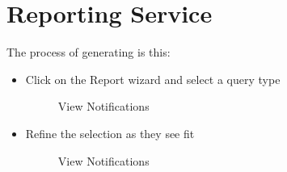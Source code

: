 \documentclass[12pt]{article}
\begin{document}
\section{Reporting Service}
The process of generating is this:
\begin{itemize}
\item Click on the Report wizard and select a query type
\begin{figure}[H]
\centering	
{}
\caption{View Notifications}
\end{figure}

\item Refine the selection as they see fit
\begin{figure}[H]
\centering	
{}
\caption{View Notifications}
\end{figure}


\end{itemize}
\end{document}
